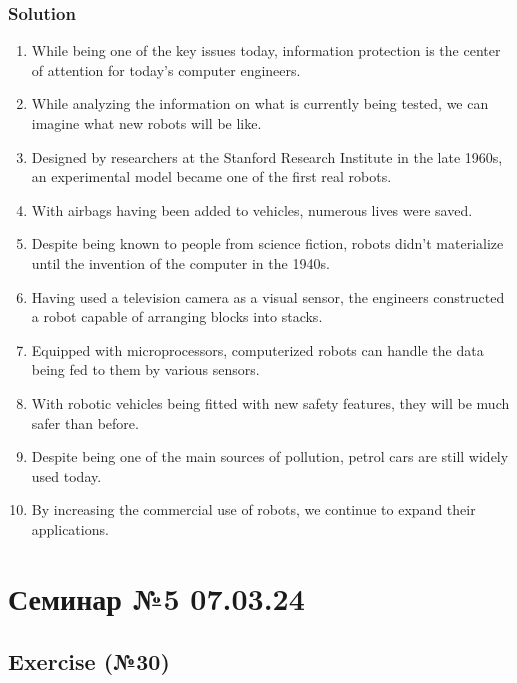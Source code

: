 \subsection*{Solution}
\begin{enumerate}
      \item While being one of the key issues today, information protection is the center of attention for today’s computer engineers.
      \item While analyzing the information on what is currently being tested, we can imagine what new robots will be like.
      \item Designed by researchers at the Stanford Research Institute in the late 1960s, an experimental model became one of the first real robots.
      \item With airbags having been added to vehicles, numerous lives were saved.
      \item Despite being known to people from science fiction, robots didn’t materialize until the invention of the computer in the 1940s.
      \item Having used a television camera as a visual sensor, the engineers constructed a robot capable of arranging blocks into stacks.
      \item Equipped with microprocessors, computerized robots can handle the data being fed to them by various sensors.
      \item With robotic vehicles being fitted with new safety features, they will be much safer than before.
      \item Despite being one of the main sources of pollution, petrol cars are still widely used today.
      \item By increasing the commercial use of robots, we continue to expand their applications.
\end{enumerate}

\chapter{Семинар №5 07.03.24}

\section{Exercise (№30)}
